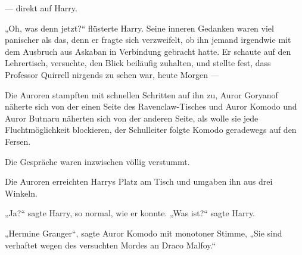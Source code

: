— direkt auf Harry.

„Oh, was denn jetzt?“ flüsterte Harry. Seine inneren Gedanken waren viel panischer als das, denn er fragte sich verzweifelt, ob ihn jemand irgendwie mit dem Ausbruch aus Askaban in Verbindung gebracht hatte. Er schaute auf den Lehrertisch, versuchte, den Blick beiläufig zuhalten, und stellte fest, dass Professor Quirrell nirgends zu sehen war, heute Morgen —

Die Auroren stampften mit schnellen Schritten auf ihn zu, Auror Goryanof näherte sich von der einen Seite des Ravenclaw-Tisches und Auror Komodo und Auror Butnaru näherten sich von der anderen Seite, als wolle sie jede Fluchtmöglichkeit blockieren, der Schulleiter folgte Komodo geradewegs auf den Fersen.

Die Gespräche waren inzwischen völlig verstummt.

Die Auroren erreichten Harrys Platz am Tisch und umgaben ihn aus drei Winkeln.

„Ja?“ sagte Harry, so normal, wie er konnte.
„Was ist?“ sagte Harry.

„Hermine Granger“, sagte Auror Komodo mit monotoner Stimme,
„Sie sind verhaftet wegen des versuchten Mordes an Draco Malfoy.“

